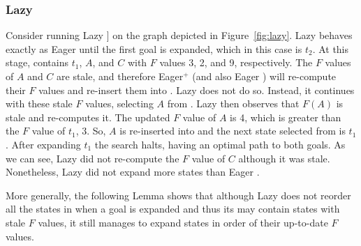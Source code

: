 
\subsubsection{Lazy \kastarmin}

Consider running Lazy \kastarmin [[AF: also never defined]] on the graph depicted in Figure~\ref{fig:lazy}.
Lazy \kastarmin behaves exactly as Eager \kastarmin until the first goal is expanded, which in this case is $t_2$.
At this stage, \open contains $t_1$, $A$, and $C$ with $F$ values 3, 2, and 9, respectively.
The $F$ values of $A$ and $C$ are stale, and therefore Eager$^+$ \kastarmin (and also Eager \kastarmin) will re-compute their $F$ values and re-insert them into \open.
Lazy \kastarmin does not do so.
Instead, it continues with these stale $F$ values, selecting $A$ from \open.
Lazy \kastarmin then observes that $F(A)$ is stale and re-computes it.
The updated $F$ value of $A$ is 4, which is greater than the $F$ value of $t_1$, 3.
So, $A$ is re-inserted into \open and the next state selected from \open is $t_1$.
After expanding $t_1$ the search halts, having an optimal path to both goals.
As we can see, Lazy \kastarmin did not re-compute the $F$ value of $C$ although it was stale.
Nonetheless, Lazy \kastarmin did not expand more states than Eager \kastarmin.

More generally, the following Lemma shows that although Lazy \kastarmin does not reorder all the states in \open when a goal is expanded and thus its \open may contain states with stale $F$ values,
it still manages to expand states in order of their up-to-date $F$ values. %


